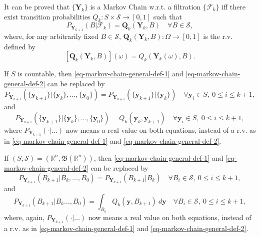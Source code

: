 It can be proved \cite{Du05} that $\{\mathbf{Y}_k\}$ is a Markov Chain w.r.t. a filtration $\{\mathcal{F}_k\}$ iff
there exist transition probabilities $Q_k:S\times\mathcal{S}\rightarrow [0,1]$ such that
\begin{equation}\label{eq-markov-chain-general-def-2}
P_{\mathbf{Y}_{k+1}}(B|\mathcal{F}_k) = \mathbf{Q}_k(\mathbf{Y}_k,B)\quad\forall B\in\mathcal{S},
\end{equation}
where, for any arbitrarily fixed $B\in\mathcal{S}$, $\mathbf{Q}_k(\mathbf{Y}_k,B):\Omega\rightarrow [0,1]$ is the r.v. defined by
\begin{equation*}
\left[\mathbf{Q}_k(\mathbf{Y}_k,B)\right](\omega) = Q_k(\mathbf{Y}_k(\omega),B).
\end{equation*}

If $S$ is countable, then \eqref{eq-markov-chain-general-def-1} and \eqref{eq-markov-chain-general-def-2} can be replaced by
\begin{equation}\label{eq-markov-chain-countable-def-1}
P_{\mathbf{Y}_{k+1}}(
\{\mathbf{y}_{k+1}\}
|
\{\mathbf{y}_k\},
\ldots,
\{\mathbf{y}_0\}
)
=
P_{\mathbf{Y}_{k+1}}(
\{\mathbf{y}_{k+1}\}
|
\{\mathbf{y}_k\}
)
\quad\forall
\mathbf{y}_i\in S,~0\leqslant i\leqslant k+1,
\end{equation}
and
\begin{equation}\label{eq-markov-chain-countable-def-2}
P_{\mathbf{Y}_{k+1}}(
\{\mathbf{y}_{k+1}\}
|
\{\mathbf{y}_k\},
\ldots,
\{\mathbf{y}_0\}
)
=
Q_k(
\mathbf{y}_k,
\mathbf{y}_{k+1}
)
\quad\forall
\mathbf{y}_i\in S,~0\leqslant i\leqslant k+1,
\end{equation}
where
$P_{\mathbf{Y}_{k+1}}(\cdot|\ldots)$ now means a real value on both equations,
instead of a r.v. as in \eqref{eq-markov-chain-general-def-1} and \eqref{eq-markov-chain-general-def-2}.

If $(S,\mathcal{S})=(\mathbb{R}^n,\mathfrak{B}(\mathbb{R}^n))$, then \eqref{eq-markov-chain-general-def-1} and \eqref{eq-markov-chain-general-def-2} can be replaced by
\begin{equation}\label{eq-markov-chain-R-def-1}
P_{\mathbf{Y}_{k+1}}(
B_{k+1}
|
B_k,
\ldots,
B_0
)
=
P_{\mathbf{Y}_{k+1}}(
B_{k+1}
|
B_k
)
\quad\forall
B_i\in\mathcal{S},~0\leqslant i\leqslant k+1,
\end{equation}
and
\begin{equation}\label{eq-markov-chain-R-def-2}
P_{\mathbf{Y}_{k+1}}(
B_{k+1}|
B_k
\ldots,
B_0
)
=
\int_{B_k} Q_k(
\mathbf{y},B_{k+1}
)~d\mathbf{y}
\quad\forall
B_i\in\mathcal{S},~0\leqslant i\leqslant k+1,
\end{equation}
where, again,
$P_{\mathbf{Y}_{k+1}}(\cdot|\ldots)$ now means a real value on both equations,
instead of a r.v. as in \eqref{eq-markov-chain-general-def-1} and \eqref{eq-markov-chain-general-def-2}.

